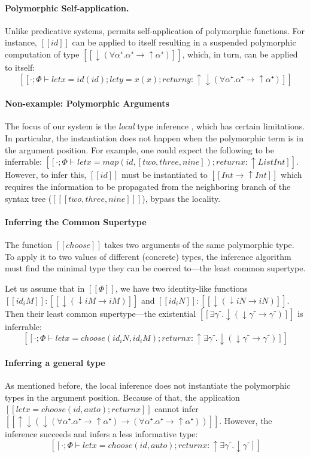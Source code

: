 \paragraph*{Polymorphic Self-application.}
  Unlike predicative systems, \fexists permits self-application of polymorphic
  functions. For instance, $[[id]]$ can be applied to itself resulting in a
  suspended polymorphic computation of type $[[↓(∀α⁺.α⁺ → ↑α⁺)]]$, which, in
  turn, can be applied to itself:
  $$[[· ; Φ ⊢ let x = id(id); let y = x(x); return y : ↑↓(∀α⁺.α⁺ → ↑α⁺)]]$$


\paragraph*{Non-example: Polymorphic Arguments}
The focus of our system is the \emph{local} type inference
\cite{pierce2000:local}, which has certain limitations. In particular, the
instantiation does not happen when the polymorphic term is in the argument
position. For example, one could expect the following to be inferrable:
\mbox{$[[· ; Φ ⊢ let x = map(id, [two, three, nine]); return x : ↑ List Int]]$}.
However, to infer this, $[[id]]$ must be instantiated to \mbox{$[[Int → ↑Int]]$}
which requires the information to be propagated from the neighboring branch of
the syntax tree (\mbox{$[[ [two, three, nine] ]]$}), \ie bypass the locality. 


\paragraph*{Inferring the Common Supertype}
  The function $[[choose]]$ takes two arguments of the same
  polymorphic type. To apply it to two values of different (concrete) types, 
  the inference algorithm must find the minimal type they can be coerced 
  to---the least common supertype.

  Let us assume that in $[[Φ]]$, we have two identity-like functions 
  \mbox{$[[id_iM]] : [[↓(↓iM → iM)]]$} and \mbox{$[[id_iN]] : [[↓(↓iN → iN)]]$}.
  Then their least common supertype---the existential $[[∃γ⁻.↓(↓γ⁻ → γ⁻)]]$
  is inferrable:
  $$[[· ; Φ ⊢ let x = choose (id_iN, id_iM); return x : ↑ ∃γ⁻.↓(↓γ⁻ → γ⁻)]]$$

\paragraph*{Inferring a general type}
  As mentioned before, the local inference does not instantiate the polymorphic
  types in the argument position.
  Because of that, the application 
  \mbox{$[[let x = choose (id, auto); return x ]]$} cannot infer 
  $[[↑↓(↓(∀α⁺.α⁺ → ↑α⁺) → (∀α⁺.α⁺ → ↑α⁺))]]$.
  However, the inference succeeds and infers a less informative type:
  $$[[· ; Φ ⊢ let x = choose (id, auto); return x : ↑ ∃γ⁻.↓γ⁻]]$$

